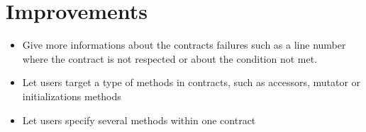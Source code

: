 \section{Improvements}
\begin{itemize}
\item{Give more informations about the contracts failures such as a line number where the contract is not respected or about the condition not met.}
\item{Let users target a type of methods in contracts, such as accessors, mutator or initializations methods}
\item{Let users specify several methods within one contract}
\end{itemize}  
 